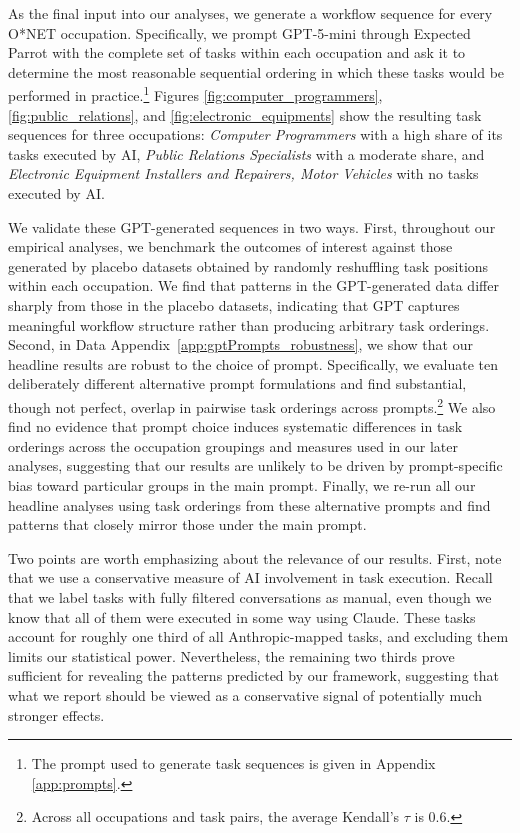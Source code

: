 As the final input into our analyses, we generate a workflow sequence for every O*NET occupation. 
Specifically, we prompt GPT-5-mini through Expected Parrot \citep{Horton2024EDSL} with the complete set of tasks within each occupation and ask it to determine the most reasonable sequential ordering in which these tasks would be performed in practice.\footnote{The prompt used to generate task sequences is given in Appendix \ref{app:prompts}.
}
Figures \ref{fig:computer_programmers}, \ref{fig:public_relations}, and \ref{fig:electronic_equipments} show the resulting task sequences for three occupations: \textit{Computer Programmers} with a high share of its tasks executed by AI, \textit{Public Relations Specialists} with a moderate share, and \textit{Electronic Equipment Installers and Repairers, Motor Vehicles} with no tasks executed by AI.

We validate these GPT-generated sequences in two ways. 
First, throughout our empirical analyses, we benchmark the outcomes of interest against those generated by placebo datasets obtained by randomly reshuffling task positions within each occupation. 
We find that patterns in the GPT-generated data differ sharply from those in the placebo datasets, indicating that GPT captures meaningful workflow structure rather than producing arbitrary task orderings. 
Second, in Data Appendix~\ref{app:gptPrompts_robustness}, we show that our headline results are robust to the choice of prompt. 
Specifically, we evaluate ten deliberately different alternative prompt formulations and find substantial, though not perfect, overlap in pairwise task orderings across prompts.\footnote{%
Across all occupations and task pairs, the average Kendall's $\tau$ is 0.6.%
} 
We also find no evidence that prompt choice induces systematic differences in task orderings across the occupation groupings and measures used in our later analyses, suggesting that our results are unlikely to be driven by prompt-specific bias toward particular groups in the main prompt. 
Finally, we re-run all our headline analyses using task orderings from these alternative prompts and find patterns that closely mirror those under the main prompt. 

Two points are worth emphasizing about the relevance of our results.
First, note that we use a conservative measure of AI involvement in task execution.
Recall that we label tasks with fully filtered conversations as manual, even though we know that all of them were executed in some way using Claude.
These tasks account for roughly one third of all Anthropic-mapped tasks, and excluding them limits our statistical power.
Nevertheless, the remaining two thirds prove sufficient for revealing the patterns predicted by our framework, suggesting that what we report should be viewed as a conservative signal of potentially much stronger effects.

